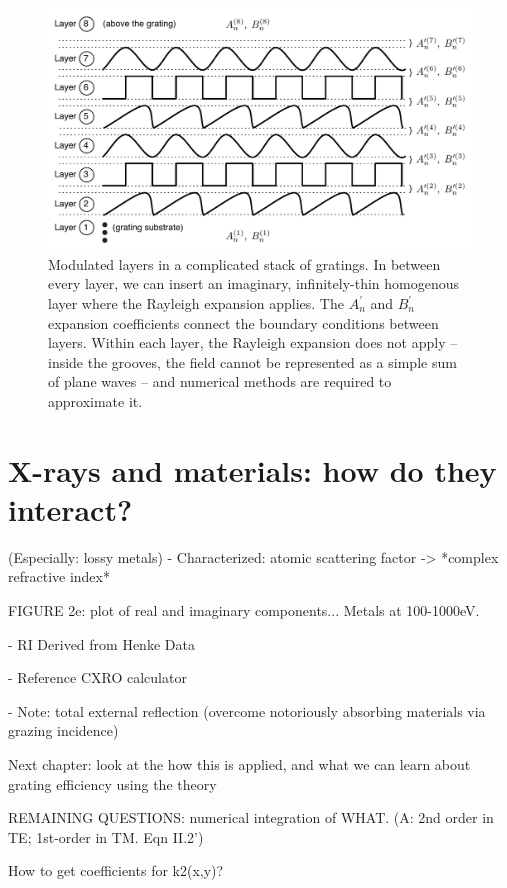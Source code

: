 \begin{figure}[htbp] %
   \centering
   \includegraphics[scale=0.8]{../data/Chapter2/2d_stacksOfGratings/2d_2.pdf} 
   \caption{Modulated layers in a complicated stack of gratings.  In between every layer, we can insert an imaginary, infinitely-thin homogenous layer where the Rayleigh expansion applies.  The $A^{\prime}_n$ and $B^{\prime}_n$ expansion coefficients connect the boundary conditions between layers.  Within each layer, the Rayleigh expansion does not apply -- inside the grooves, the field cannot be represented as a simple sum of plane waves -- and numerical methods are required to approximate it.}
   \label{2d-2}
\end{figure}


\section{X-rays and materials: how do they interact?} (Especially: lossy metals)
          - Characterized: atomic scattering factor -> *complex refractive index*
          
          FIGURE 2e: plot of real and imaginary components... Metals at 100-1000eV.
          
          - RI Derived from Henke Data
          
               - Reference CXRO calculator
               
          - Note: total external reflection (overcome notoriously absorbing materials via grazing incidence)


Next chapter: look at the how this is applied, and what we can learn about grating efficiency using the theory

REMAINING QUESTIONS: numerical integration of WHAT.  (A: 2nd order in TE; 1st-order in TM.  Eqn II.2')

	How to get coefficients for k2(x,y)?
	